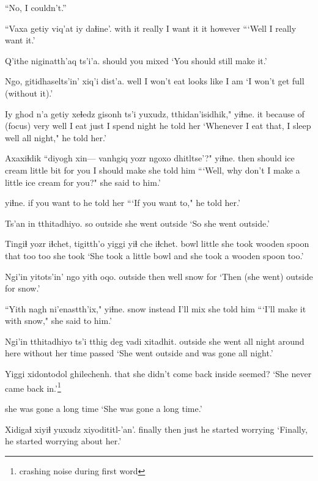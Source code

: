 \documentclass[12pt]{article}
\begin{document}
``No, I couldn't.''

\gll ``Vaxa getiy viq'at iy daɬine'. 
{with it} really {I want it} it however 
\glt ```Well I really want it.' 
\glend

\gll  Q'ithe niginatth'aq ts'i'a.
should {you mixed} {} 
\glt `You should still make it.' 
\glend

\gll  Ngo, {gitidhaselts'in'} xiq'i dist'a.
well {I won't eat} {looks like} {I am}
\glt `I won't get full (without it).'
\glend

\gll Iy ghod n'a getiy xeɬedz gisonh ts'i yuxudz, tthidan'isidhik," yiɬne.
it {because of} (focus) very well {I eat} {} just {I spend night} {he told her}
\glt `Whenever I eat that, I sleep well all night," he told her.'
\glend

\gll Axaxiɬdik ``diyogh xin--- vanhgiq yozr ngoxo dhitltse'?" yiɬne.
then should {} {ice cream} {little bit} {for you} {I should make} {she told him}
\glt ```Well, why don't I make a little ice cream for you?" she said to him.'
\glend

 yiɬne.
{{if you want to}} {he told her}
\glt ```If you want to," he told her.'
\glend

\gll Ts'an in tthitadhiyo.
so outside {she went outside}
\glt `So she went outside.'
\glend

\gll Tingiɬ yozr iɬchet, tigitth'o yiggi yiɬ che iɬchet.
bowl little {she took} {wooden spoon} that too too {she took}
\glt `She took a little bowl and she took a wooden spoon too.'
\glend

\gll Ngi'in yitots'in' ngo yith oqo.
outside then well snow for
\glt `Then (she went) outside for snow.'
\glend

\gll ``Yith nagh ni'enastth'ix," yiɬne.
snow instead {I'll mix} {she told him}
\glt ```I'll make it with snow," she said to him.'
\glend

\gll Ngi'in tthitadhiyo ts'i tthig deg vadi xitadhit.
outside {she went} {} {all night} {around here} {without her} {time passed}
\glt `She went outside and was gone all night.'
\glend

\gll Yiggi xidontodol {ghilechenh.}
that {she didn't come back inside} seemed?
\glt `She never came back in.'\footnote{crashing noise during first word}
\glend

{{she was gone a long time}}
\glt `She was gone a long time.'
\glend

\gll Xidigaɬ xiyiɬ yuxudz xiyodititl-'an'.
finally then just {he started worrying}
\glt `Finally, he started worrying about her.'
\glend
\end{document}
